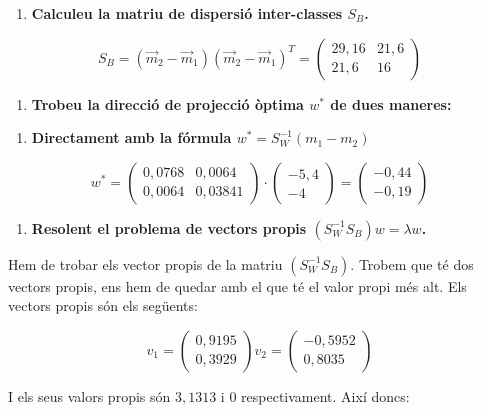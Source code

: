 \documentclass[a4paper]{article}
\begin{document}
\begin{enumerate}[resume=main]
	\item \textbf{Calculeu la matriu de dispersió inter-classes $S_B$.}
\end{enumerate}
$$
S_B = (\vec{m}_2 - \vec{m}_1)(\vec{m}_2 - \vec{m}_1)^T = 
\begin{pmatrix}
29,16 & 21,6 \\
21,6 & 16
\end{pmatrix}
$$

\begin{enumerate}[resume=main]
	\item \textbf{Trobeu la direcció de projecció òptima $w^*$ de dues maneres:}
\end{enumerate}

\begin{enumerate}[resume=second,label=(\alph*),itemindent=1em]
	\item \textbf{Directament amb la fórmula $w^* = S_W^{-1} (m_1 - m_2)$}
\end{enumerate}

$$
w^* = 
\begin{pmatrix}
0,0768 & 0,0064 \\
0,0064 & 0,03841
\end{pmatrix} ·
\begin{pmatrix}
-5,4 \\ -4
\end{pmatrix} =
\begin{pmatrix}
-0,44 \\
-0,19
\end{pmatrix}
$$

\begin{enumerate}[resume=second,label=(\alph*),itemindent=1em]
	\item \textbf{Resolent el problema de vectors propis $(S_W^{-1}S_B)w = \lambda w$.}
\end{enumerate}
Hem de trobar els vector propis de la matriu $(S_W^{-1}S_B)$. Trobem que té dos vectors propis, ens hem de quedar amb el que té el valor propi més alt. Els vectors propis són els següents:

$$
v_1 =
\begin{pmatrix}
0,9195 \\
0,3929
\end{pmatrix}
v_2 =
\begin{pmatrix}
-0,5952 \\  
0,8035 
\end{pmatrix}
$$

I els seus valors propis són $3,1313$ i $0$ respectivament. Així doncs:
\end{document}
